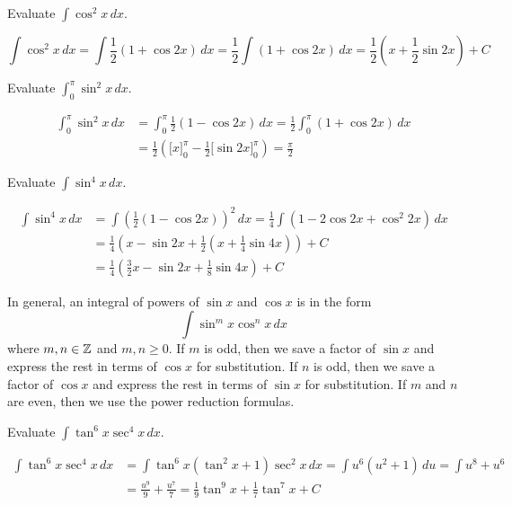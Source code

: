 \begin{problem}
    Evaluate \(\displaystyle{\int\cos^2 x\,dx}\).
\end{problem}
\begin{solution}
    \[\int\cos^2 x\,dx=\int\frac{1}{2}(1+\cos 2x)\,dx
    =\frac{1}{2}\int(1+\cos 2x)\,dx
    =\frac{1}{2}\left(x+\frac{1}{2}\sin 2x\right)+C\]
\end{solution}
\begin{problem}
    Evaluate \(\displaystyle{\int_0^\pi\sin^2 x\,dx}\).
\end{problem}
\begin{solution}
    \begin{align*}
    \int_0^\pi\sin^2 x\,dx &= \int_0^\pi\frac{1}{2}(1-\cos 2x)\,dx
    =\frac{1}{2}\int_0^{\pi}(1+\cos 2x)\,dx \\
    &=\frac{1}{2}
    \left(\bigl[x\bigr]_0^\pi-\frac{1}{2}\bigl[\sin 2x\bigr]_0^\pi\right)
    =\frac{\pi}{2}
    \end{align*}
\end{solution}
\begin{problem}
    Evaluate \(\displaystyle{\int\sin^4 x\,dx}\).
\end{problem}
\begin{solution}
    \begin{align*}
        \int\sin^4 x\,dx &= \int\left(\frac{1}{2}(1-\cos 2x)\right)^2\,dx
        =\frac{1}{4}\int(1-2\cos 2x+\cos^2 2x)\,dx \\
        &= \frac{1}{4}
        \left(x-\sin 2x+\frac{1}{2}
        \left(x+\frac{1}{4}\sin 4x\right)\right)+C \\
        &= \frac{1}{4}
        \left(\frac{3}{2}x-\sin 2x+\frac{1}{8}\sin 4x\right)+C
    \end{align*}
\end{solution}
In general, an integral of powers of \(\sin x\) and \(\cos x\) is in the
form
\[\int\sin^m x\cos^n x\,dx\]
where \(m,n\in\mathbb{Z}\) and \(m,n\geq 0\).
If \(m\) is odd, then we save a factor of \(\sin x\) and express the rest in
terms of \(\cos x\) for substitution.
If \(n\) is odd, then we save a factor of \(\cos x\) and express the rest in
terms of \(\sin x\) for substitution.
If \(m\) and \(n\) are even, then we use the power reduction formulas.
\begin{problem}
    Evaluate \(\displaystyle{\int\tan^6 x\sec^4 x\,dx}\).
\end{problem}
\begin{solution}
    \begin{align*}
        \int\tan^6 x\sec^4 x\,dx &= \int\tan^6 x(\tan^2 x+1)\sec^2 x\,dx
        =\int u^6(u^2+1)\,du=\int u^8+u^6 \\
        & =\frac{u^9}{9}+\frac{u^7}{7}
        =\frac{1}{9}\tan^9 x+\frac{1}{7}\tan^7 x+C
    \end{align*}
\end{solution}
